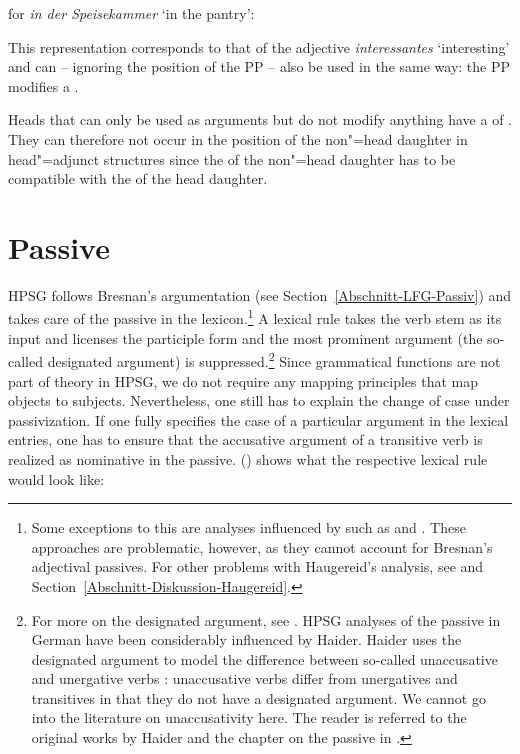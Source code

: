 \eas
\catv for \emph{in der Speisekammer} `in the pantry':\\
\zs

\noindent
This representation corresponds to that of the adjective \emph{interessantes} `interesting' and can -- ignoring the position of the PP -- also be used in the same way:
the PP modifies a \nbar.

Heads that can only be used as arguments but do not modify anything have a \modv of .
They can therefore not occur in the position of the non"=head daughter in head"=adjunct structures since the \modv of the non"=head daughter has to be compatible
with the \synsemv of the head daughter.

\section{Passive}
\label{Abschnitt-HPSG-Passiv}\label{sec-hpsg-passive}

HPSG follows Bresnan's argumentation (see Section~\ref{Abschnitt-LFG-Passiv}) and takes care of the passive in the lexicon.\footnote{
	Some exceptions to this are analyses influenced by \cxg such as \citet{Tseng2007a} and \citet{Haugereid2007a}.
	These approaches are problematic, however, as they cannot account for Bresnan's adjectival passives. For other problems with
	Haugereid's analysis, see  and Section~\ref{Abschnitt-Diskussion-Haugereid}.%
} A lexical rule takes the verb stem as its input and licenses the participle form and the most prominent argument (the so-called
designated argument) is suppressed.\footnote{
	For more on the designated argument, see . HPSG analyses of the passive in German have been considerably influenced by Haider.
	Haider uses the designated argument to model the difference between so-called unaccusative
        and unergative verbs \citep{Perlmutter78}: unaccusative verbs differ from unergatives and transitives in that they do not have
	a designated argument. We cannot go into the literature on unaccusativity here. The reader is referred to the original works by Haider and the
	chapter on the passive in .
}
Since grammatical functions are not part of theory in HPSG, we do not require any mapping principles that map objects to subjects.
Nevertheless, one still has to explain the change of case under passivization. If one fully
specifies the case of a particular argument in the lexical entries, one has to ensure that the
accusative argument of a transitive verb is realized as nominative in the passive. () shows
what the respective lexical rule would look like:

